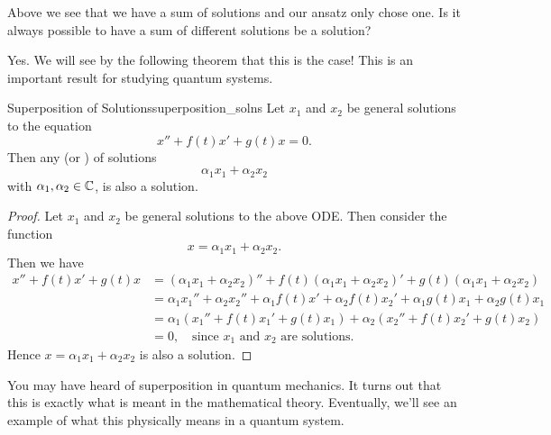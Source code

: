         \begin{question}
        Above we see that we have a sum of solutions and our ansatz only chose one. Is it always possible to have a sum of different solutions be a solution?
        \end{question}
        
        \begin{answer}
        Yes. We will see by the following theorem that this is the case! This is an important result for studying quantum systems.
        \end{answer}
        
        \begin{thm}{Superposition of Solutions}{superposition_solns}
        Let $x_1$ and $x_2$ be general solutions to the equation
        \[
        x''+f(t)x'+g(t)x=0.
        \]
        Then any  (or ) of solutions
        \[
        \alpha_1 x_1 + \alpha_2 x_2
        \]
        with $\alpha_1,\alpha_2\in \mathbb{C}$, is also a solution.\\
        
        \begin{proof}
        Let $x_1$ and $x_2$ be general solutions to the above ODE. Then consider the function
        \[
        x=\alpha_1 x_1 + \alpha_2 x_2.
        \]
        Then we have
        \begin{align*}
            x''+f(t)x'+g(t)x&= (\alpha_1 x_1 + \alpha_2 x_2)''+f(t)(\alpha_1x_1+\alpha_2 x_2)'+g(t)(\alpha_1x_1+\alpha_2x_2)\\
            &= \alpha_1 x_1'' + \alpha_2 x_2'' + \alpha_1 f(t)x'+\alpha_2 f(t)x_2'+\alpha_1 g(t)x_1 + \alpha_2 g(t) x_1\\
            &= \alpha_1 ( x_1''+f(t)x_1'+g(t)x_1)+\alpha_2(x_2''+f(t)x_2'+g(t)x_2)\\
            &=0, \quad\textrm{since $x_1$ and $x_2$ are solutions.}
        \end{align*}
        Hence $x=\alpha_1x_1 + \alpha_2 x_2$ is also a solution.
        \end{proof}
        \end{thm}
        
        \begin{remark}
        You may have heard of superposition in quantum mechanics. It turns out that this is exactly what is meant in the mathematical theory. Eventually, we'll see an example of what this physically means in a quantum system.
        \end{remark}
        
